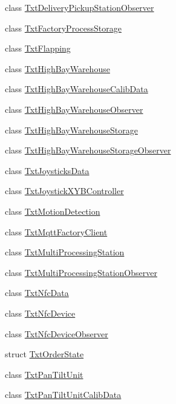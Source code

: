 \begin{DoxyCompactItemize}
\item 
class \hyperlink{classft_1_1_txt_delivery_pickup_station_observer}{Txt\+Delivery\+Pickup\+Station\+Observer}
\item 
class \hyperlink{classft_1_1_txt_factory_process_storage}{Txt\+Factory\+Process\+Storage}
\item 
class \hyperlink{classft_1_1_txt_flapping}{Txt\+Flapping}
\item 
class \hyperlink{classft_1_1_txt_high_bay_warehouse}{Txt\+High\+Bay\+Warehouse}
\item 
class \hyperlink{classft_1_1_txt_high_bay_warehouse_calib_data}{Txt\+High\+Bay\+Warehouse\+Calib\+Data}
\item 
class \hyperlink{classft_1_1_txt_high_bay_warehouse_observer}{Txt\+High\+Bay\+Warehouse\+Observer}
\item 
class \hyperlink{classft_1_1_txt_high_bay_warehouse_storage}{Txt\+High\+Bay\+Warehouse\+Storage}
\item 
class \hyperlink{classft_1_1_txt_high_bay_warehouse_storage_observer}{Txt\+High\+Bay\+Warehouse\+Storage\+Observer}
\item 
class \hyperlink{classft_1_1_txt_joysticks_data}{Txt\+Joysticks\+Data}
\item 
class \hyperlink{classft_1_1_txt_joystick_x_y_b_controller}{Txt\+Joystick\+X\+Y\+B\+Controller}
\item 
class \hyperlink{classft_1_1_txt_motion_detection}{Txt\+Motion\+Detection}
\item 
class \hyperlink{classft_1_1_txt_mqtt_factory_client}{Txt\+Mqtt\+Factory\+Client}
\item 
class \hyperlink{classft_1_1_txt_multi_processing_station}{Txt\+Multi\+Processing\+Station}
\item 
class \hyperlink{classft_1_1_txt_multi_processing_station_observer}{Txt\+Multi\+Processing\+Station\+Observer}
\item 
class \hyperlink{classft_1_1_txt_nfc_data}{Txt\+Nfc\+Data}
\item 
class \hyperlink{classft_1_1_txt_nfc_device}{Txt\+Nfc\+Device}
\item 
class \hyperlink{classft_1_1_txt_nfc_device_observer}{Txt\+Nfc\+Device\+Observer}
\item 
struct \hyperlink{structft_1_1_txt_order_state}{Txt\+Order\+State}
\item 
class \hyperlink{classft_1_1_txt_pan_tilt_unit}{Txt\+Pan\+Tilt\+Unit}
\item 
class \hyperlink{classft_1_1_txt_pan_tilt_unit_calib_data}{Txt\+Pan\+Tilt\+Unit\+Calib\+Data}

\end{DoxyCompactItemize}

